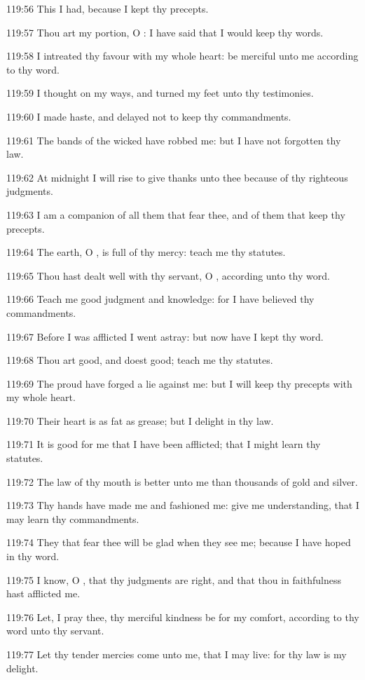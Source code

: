119:56 This I had, because I kept thy precepts.

119:57 Thou art my portion, O \LORD: I have said that I would keep thy
words.

119:58 I intreated thy favour with my whole heart: be merciful unto me
according to thy word.

119:59 I thought on my ways, and turned my feet unto thy testimonies.

119:60 I made haste, and delayed not to keep thy commandments.

119:61 The bands of the wicked have robbed me: but I have not
forgotten thy law.

119:62 At midnight I will rise to give thanks unto thee because of thy
righteous judgments.

119:63 I am a companion of all them that fear thee, and of them that
keep thy precepts.

119:64 The earth, O \LORD, is full of thy mercy: teach me thy statutes.

119:65 Thou hast dealt well with thy servant, O \LORD, according unto
thy word.

119:66 Teach me good judgment and knowledge: for I have believed thy
commandments.

119:67 Before I was afflicted I went astray: but now have I kept thy
word.

119:68 Thou art good, and doest good; teach me thy statutes.

119:69 The proud have forged a lie against me: but I will keep thy
precepts with my whole heart.

119:70 Their heart is as fat as grease; but I delight in thy law.

119:71 It is good for me that I have been afflicted; that I might
learn thy statutes.

119:72 The law of thy mouth is better unto me than thousands of gold
and silver.

119:73 Thy hands have made me and fashioned me: give me understanding,
that I may learn thy commandments.

119:74 They that fear thee will be glad when they see me; because I
have hoped in thy word.

119:75 I know, O \LORD, that thy judgments are right, and that thou in
faithfulness hast afflicted me.

119:76 Let, I pray thee, thy merciful kindness be for my comfort,
according to thy word unto thy servant.

119:77 Let thy tender mercies come unto me, that I may live: for thy
law is my delight.

